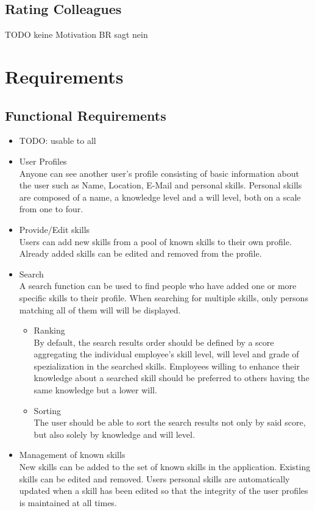 \subsection{Rating Colleagues}
TODO
keine Motivation
BR sagt nein



\section{Requirements}
\subsection{Functional Requirements}
\begin{itemize}
  \item TODO: usable to all
	\item User Profiles \\
	Anyone can see another user’s profile consisting of basic information about the user such as Name, Location, E-Mail and personal skills. Personal skills are composed of a name, a knowledge level and a will level, both on a scale from one to four.
	\item Provide/Edit skills\\
	Users can add new skills from a pool of known skills to their own profile. Already added skills can be edited and removed from the profile.
	\item Search\\
	A search function can be used to find people who have added one or more specific skills to their profile. When searching for multiple skills, only persons matching all of them will will be displayed.
	\begin{itemize}
		\item Ranking\\
			By default, the search results order should be defined by a score aggregating the individual employee's skill level, will level and grade of spezialization in the searched skills. Employees willing to enhance their knowledge about a searched skill should be preferred to others having the same knowledge but a lower will.
		\item Sorting\\
			The user should be able to sort the search results not only by said score,
			but also solely by knowledge and will level.
	\end{itemize}
	\item Management of known skills\\
	New skills can be added to the set of known skills in the application. Existing skills can be edited and removed. Users personal skills are automatically updated when a skill has been edited so that the integrity of the user profiles is maintained at all times.
\end{itemize}

